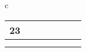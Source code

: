 \begin{longtable}{c}
{\begin{tabular}{cllllcc}
	\multicolumn{1}{|c|}{23}          & \multicolumn{1}{l|}{}           & \multicolumn{1}{l|}{}                                                                                                                                                                                             & \multicolumn{1}{l|}{}                                                                                                                                     & \multicolumn{1}{l|}{}                                                                                                                                                                                                                & \multicolumn{1}{c|}{}                                                                                & \multicolumn{1}{c|}{}                                                                                 \\ \hline
	\multicolumn{1}{l}{}              &                                 &                                                                                                                                                                                                                   &                                                                                                                                                           &                                                                                                                                                                                                                                      & \multicolumn{1}{l}{}                                                                                 & \multicolumn{1}{l}{}                                                                                  \\
	\multicolumn{1}{l}{}              &                                 &                                                                                                                                                                                                                   &                                                                                                                                                           &                                                                                                                                                                                                                                      & \multicolumn{1}{l}{}                                                                                 & \multicolumn{1}{l}{}                                                                                  \\

\end{tabular}}
\end{longtable}
